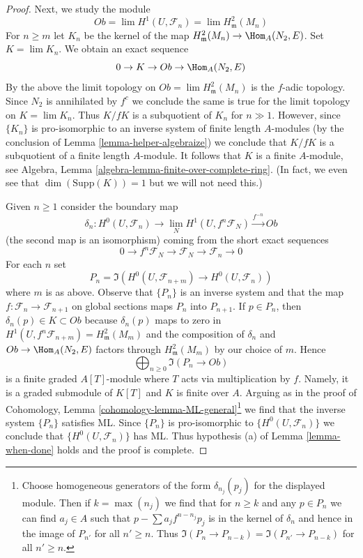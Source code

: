 \begin{proof}
\medskip\noindent
Next, we study the module
$$
Ob = \lim H^1(U, \mathcal{F}_n) = \lim H^2_\mathfrak m(M_n)
$$
For $n \geq m$ let $K_n$ be the kernel of the map
$H^2_\mathfrak m(M_n) \to \Hom_A(N_2, E)$.
Set $K = \lim K_n$. We obtain an exact sequence
$$
0 \to K \to Ob \to \Hom_A(N_2, E)
$$
By the above the limit topology on $Ob = \lim H^2_\mathfrak m(M_n)$
is the $f$-adic topology. Since $N_2$ is annihilated by $f^c$
we conclude the same is true for the limit topology on $K = \lim K_n$.
Thus $K/fK$ is a subquotient of $K_n$ for $n \gg 1$.
However, since $\{K_n\}$ is pro-isomorphic to an inverse system of
finite length $A$-modules (by the conclusion of
Lemma \ref{lemma-helper-algebraize})
we conclude that $K/fK$ is a subquotient of a finite length
$A$-module. It follows that $K$ is a finite $A$-module, see
Algebra, Lemma \ref{algebra-lemma-finite-over-complete-ring}.
(In fact, we even see that $\dim(\text{Supp}(K)) = 1$ but
we will not need this.)

\medskip\noindent
Given $n \geq 1$ consider the boundary map
$$
\delta_n :
H^0(U, \mathcal{F}_n)
\longrightarrow
\lim_N H^1(U, f^n\mathcal{F}_N) \xrightarrow{f^{-n}} Ob
$$
(the second map is an isomorphism)
coming from the short exact sequences
$$
0 \to f^n\mathcal{F}_N \to \mathcal{F}_N \to \mathcal{F}_n \to 0
$$
For each $n$ set
$$
P_n = \Im(H^0(U, \mathcal{F}_{n + m}) \to H^0(U, \mathcal{F}_n))
$$
where $m$ is as above. Observe that $\{P_n\}$ is an inverse
system and that the map $f : \mathcal{F}_n \to \mathcal{F}_{n + 1}$
on global sections maps $P_n$ into $P_{n + 1}$.
If $p \in P_n$, then $\delta_n(p) \in K \subset Ob$
because $\delta_n(p)$ maps to zero in
$H^1(U, f^n\mathcal{F}_{n + m}) = H^2_\mathfrak m(M_m)$
and the composition of $\delta_n$ and $Ob \to \Hom_A(N_2, E)$
factors through $H^2_\mathfrak m(M_m)$ by our choice of $m$.
Hence
$$
\bigoplus\nolimits_{n \geq 0} \Im(P_n \to Ob)
$$
is a finite graded $A[T]$-module where $T$ acts via multiplication by $f$.
Namely, it is a graded submodule of $K[T]$ and $K$ is finite over $A$.
Arguing as in the proof of
Cohomology, Lemma \ref{cohomology-lemma-ML-general}\footnote{Choose
homogeneous generators of the form $\delta_{n_j}(p_j)$ for the displayed
module. Then if $k = \max(n_j)$ we find that for $n \geq k$
and any $p \in P_n$ we can find $a_j \in A$ such that
$p - \sum a_j f^{n - n_j} p_j$ is in the kernel of $\delta_n$
and hence in the image of $P_{n'}$ for all $n' \geq n$.
Thus $\Im(P_n \to P_{n - k}) = \Im(P_{n'} \to P_{n - k})$
for all $n' \geq n$.}
we find that the inverse system $\{P_n\}$ satisfies ML.
Since $\{P_n\}$ is pro-isomorphic to $\{H^0(U, \mathcal{F}_n)\}$
we conclude that $\{H^0(U, \mathcal{F}_n)\}$ has ML.
Thus hypothesis (a) of Lemma \ref{lemma-when-done}
holds and the proof is complete.
\end{proof}
